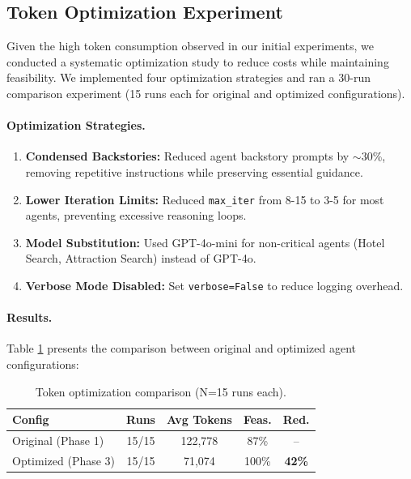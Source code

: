 \documentclass[10pt,twocolumn]{article}
\begin{document}
\subsection{Token Optimization Experiment}

Given the high token consumption observed in our initial experiments, we conducted a systematic optimization study to reduce costs while maintaining feasibility. We implemented four optimization strategies and ran a 30-run comparison experiment (15 runs each for original and optimized configurations).

\paragraph{Optimization Strategies.}
\begin{enumerate}
    \item \textbf{Condensed Backstories:} Reduced agent backstory prompts by $\sim$30\%, removing repetitive instructions while preserving essential guidance.
    \item \textbf{Lower Iteration Limits:} Reduced \texttt{max\_iter} from 8-15 to 3-5 for most agents, preventing excessive reasoning loops.
    \item \textbf{Model Substitution:} Used GPT-4o-mini for non-critical agents (Hotel Search, Attraction Search) instead of GPT-4o.
    \item \textbf{Verbose Mode Disabled:} Set \texttt{verbose=False} to reduce logging overhead.
\end{enumerate}

\paragraph{Results.}
Table \ref{tab:token_optimization} presents the comparison between original and optimized agent configurations:

\begin{table}[!htbp]
\centering
\small
\begin{tabular}{lcccc}
\toprule
\textbf{Config} & \textbf{Runs} & \textbf{Avg Tokens} & \textbf{Feas.} & \textbf{Red.} \\
\midrule
Original (Phase 1) & 15/15 & 122,778 & 87\% & -- \\
Optimized (Phase 3) & 15/15 & 71,074 & 100\% & \textbf{42\%} \\
\bottomrule
\end{tabular}
\caption{Token optimization comparison (N=15 runs each).}
\label{tab:token_optimization}
\end{table}
\end{document}
